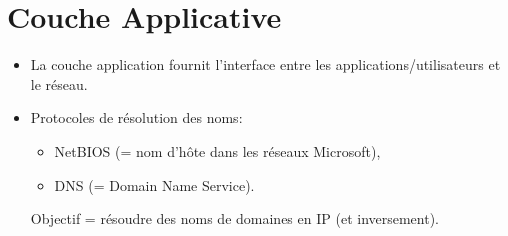 \documentclass[a4paper]{article}
\begin{document}
\section{Couche Applicative}





\begin{itemize}





\item La couche application fournit l'interface entre les applications/utilisateurs et le réseau.





\item Protocoles de résolution des noms:
\begin{itemize}
    \item NetBIOS (= nom d'hôte dans les réseaux Microsoft),
    \item DNS (= Domain Name Service).
\end{itemize}
Objectif = résoudre des noms de domaines en IP (et inversement).






\end{itemize}
\end{document}
